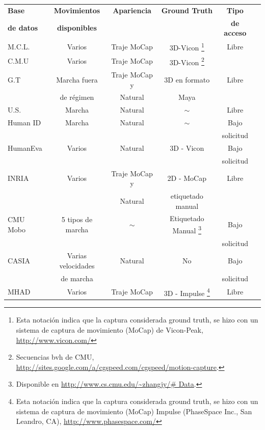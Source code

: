 \begin{table}[ht!]
\begin{minipage}{\textwidth}
{\begin{tabular}{||l|ccccc||}
\rowcolor[HTML]{CBCEFB}
\textbf{Base}     & \textbf{Movimientos}  & \textbf{Apariencia}    & \textbf{Ground Truth} & \textbf{Tipo}  & \\
\rowcolor[HTML]{CBCEFB}
\textbf{de datos} & \textbf{disponibles} &               &           & \textbf{de acceso} & \\
\hline \hline
{M.C.L. }   & Varios    &  Traje MoCap & 3D-Vicon \footnote{ Esta notación indica que la captura considerada ground truth, se hizo con un sistema  de captura de movimiento (MoCap) de Vicon-Peak, \textcolor{blue}{\underline{\url{http://www.vicon.com/}}} } & Libre & \\ \hline
{C.M.U }    & Varios    &  Traje MoCap & 3D-Vicon \footnote{Secuencias bvh de CMU, \textcolor{blue}{\underline{\url{http://sites.google.com/a/cgspeed.com/cgspeed/motion-capture}}}.} & & \\ \hline
{G.T} &     Marcha fuera&     Traje MoCap y       & 3D  en formato & Libre & \\ 
 &	   de régimen  &  Natural   &   Maya & & \\ \hline
U.S. &       Marcha    &  Natural    &  $\sim$ & Libre   &   \\	\hline
Human ID &     Marcha    & Natural  & $\sim$ & Bajo  &       \\ 
						 &        &   &  & solicitud &       \\ \hline
HumanEva &     Varios    & Natural  & 3D - Vicon & Bajo  &       \\ 
						 &        &   &  & solicitud &       \\ \hline
INRIA &       Varios    & Traje MoCap y            & 2D - MoCap &  Libre &       \\
&           & Natural            &   etiquetado manual  & &         \\ \hline
CMU Mobo &     5 tipos de marcha    & $\sim$           & Etiquetado Manual \footnote{Disponible en  \textcolor{blue}{\underline{\url{http://www.cs.cmu.edu/~zhangjy/\# Data}}}.}& Bajo  &       \\ 
 							 &        &   &  & solicitud &       \\ \hline
CASIA &  Varias velocidades       &   Natural         & No  &    Bajo     &      \\ 
& de marcha        &            &   & solicitud        &      \\ \hline
MHAD & Varios        & Traje MoCap            & 3D - Impulse \footnote{ Esta notación indica que la captura considerada ground truth, se hizo con un sistema  de captura de movimiento (MoCap) Impulse (PhaseSpace Inc., San Leandro, CA), \textcolor{blue}{\underline{\url{http://www.phasespace.com/}}} }    & Libre  &       \\
\hline
	\end{tabular}
	} %
	\end{minipage}	
\end{table}

